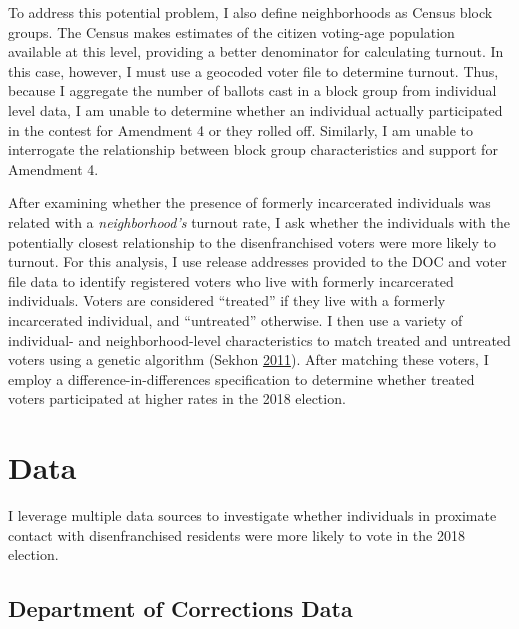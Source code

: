 \documentclass[
  12pt,
]{article}
\begin{document}
To address this potential problem, I also define neighborhoods as Census block groups. The Census makes estimates of the citizen voting-age population available at this level, providing a better denominator for calculating turnout. In this case, however, I must use a geocoded voter file to determine turnout. Thus, because I aggregate the number of ballots cast in a block group from individual level data, I am unable to determine whether an individual actually participated in the contest for Amendment 4 or they rolled off. Similarly, I am unable to interrogate the relationship between block group characteristics and support for Amendment 4.

After examining whether the presence of formerly incarcerated individuals was related with a \emph{neighborhood's} turnout rate, I ask whether the individuals with the potentially closest relationship to the disenfranchised voters were more likely to turnout. For this analysis, I use release addresses provided to the DOC and voter file data to identify registered voters who live with formerly incarcerated individuals. Voters are considered ``treated'' if they live with a formerly incarcerated individual, and ``untreated'' otherwise. I then use a variety of individual- and neighborhood-level characteristics to match treated and untreated voters using a genetic algorithm (Sekhon \protect\hyperlink{ref-Sekhon2011}{2011}). After matching these voters, I employ a difference-in-differences specification to determine whether treated voters participated at higher rates in the 2018 election.

\hypertarget{data}{%
\section*{Data}\label{data}}

I leverage multiple data sources to investigate whether individuals in proximate contact with disenfranchised residents were more likely to vote in the 2018 election.

\hypertarget{department-of-corrections-data}{%
\subsection*{Department of Corrections Data}\label{department-of-corrections-data}}
\end{document}
